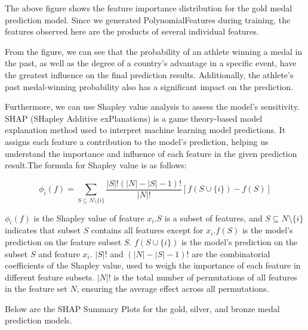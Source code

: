 \documentclass[12pt]{article}  %
\begin{document}
The above figure shows the feature importance distribution for the gold medal prediction model. Since we generated PolynomialFeatures during training, the features observed here are the products of several individual features.

From the figure, we can see that the probability of an athlete winning a medal in the past, as well as the degree of a country's advantage in a specific event, have the greatest influence on the final prediction results. Additionally, the athlete’s past medal-winning probability also has a significant impact on the prediction.

Furthermore, we can use Shapley value analysis to assess the model's sensitivity. SHAP (SHapley Additive exPlanations) is a game theory-based model explanation method used to interpret machine learning model predictions. It assigns each feature a contribution to the model's prediction, helping us understand the importance and influence of each feature in the given prediction result.The formula for Shapley value is as follows:


\begin{equation}
	\phi_i(f) = \sum_{S \subseteq N \setminus \{i\}} \frac{|S|!(|N|-|S|-1)!}{|N|!} [ f(S \cup \{i\}) - f(S)]
\end{equation}


\(\phi_i(f)\) is the Shapley value of feature \(x_i\).\(S\) is a subset of features, and \(S \subseteq N \setminus \{i\}\) indicates that subset \(S\) contains all features except for \(x_i\).\(f(S)\) is the model's prediction on the feature subset \(S\).
\(f(S \cup \{i\})\) is the model's prediction on the subset \(S\) and feature \(x_i\).
\(|S|!\) and \((|N|-|S|-1)!\) are the combinatorial coefficients of the Shapley value, used to weigh the importance of each feature in different feature subsets.
\(|N|!\) is the total number of permutations of all features in the feature set \(N\), ensuring the average effect across all permutations.

Below are the SHAP Summary Plots for the gold, silver, and bronze medal prediction models.
\end{document}
